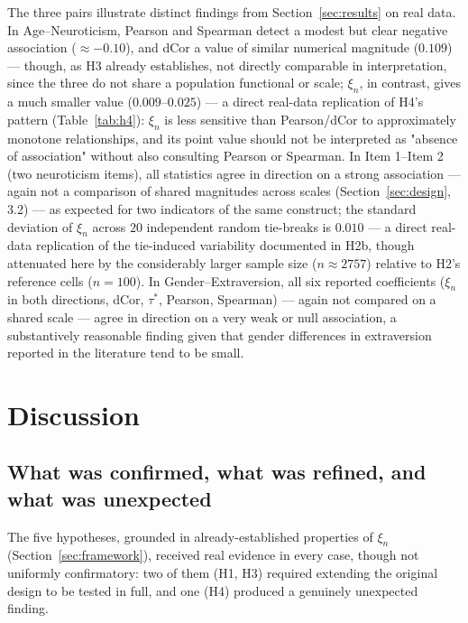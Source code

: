 \documentclass[article]{ajs}
\begin{document}
The three pairs illustrate distinct findings from Section~\ref{sec:results}
on real data. In Age--Neuroticism, Pearson and Spearman detect a
modest but clear negative association ($\approx -0.10$), and dCor a
value of similar numerical magnitude ($0.109$) --- though, as H3
already establishes, not directly comparable in interpretation, since
the three do not share a population functional or scale; $\xi_n$, in
contrast, gives a much smaller value ($0.009$--$0.025$) --- a direct
real-data replication of H4's pattern (Table~\ref{tab:h4}): $\xi_n$ is
less sensitive than Pearson/dCor to approximately monotone
relationships, and its point value should not be interpreted as
"absence of association" without also consulting Pearson or Spearman.
In Item 1--Item 2 (two neuroticism items), all statistics agree in
direction on a strong association --- again not a comparison of shared
magnitudes across scales (Section~\ref{sec:design}, 3.2) --- as
expected for two indicators of the same construct; the standard
deviation of $\xi_n$ across $20$ independent random tie-breaks is
$0.010$ --- a direct real-data replication of the tie-induced
variability documented in H2b, though attenuated here by the
considerably larger sample size ($n\approx 2757$) relative to H2's
reference cells ($n=100$). In Gender--Extraversion, all six reported
coefficients ($\xi_n$ in both directions, dCor, $\tau^\ast$, Pearson,
Spearman) --- again not compared on a shared scale --- agree in
direction on a very weak or null association, a substantively
reasonable finding given that gender differences in extraversion
reported in the literature tend to be small.

\section{Discussion} \label{sec:discussion}

\subsection{What was confirmed, what was refined, and what was unexpected}

The five hypotheses, grounded in already-established properties of
$\xi_n$ (Section~\ref{sec:framework}), received real evidence in every
case, though not uniformly confirmatory: two of them (H1, H3) required
extending the original design to be tested in full, and one (H4)
produced a genuinely unexpected finding.
\end{document}
